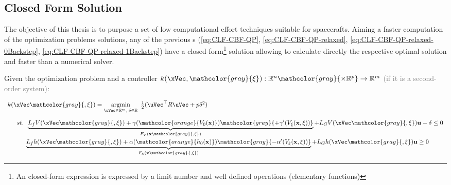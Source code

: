 \subsection{Closed Form Solution}
\label{sub:closed_form}

The objective of this thesis is to purpose a set of low computational effort techniques suitable for spacecrafts. Aiming a faster computation of the optimization problems solutions, any of the previous s (\ref{eq:CLF-CBF-QP}, \ref{eq:CLF-CBF-QP-relaxed}, \ref{eq:CLF-CBF-QP-relaxed-0Backstep}, \ref{eq:CLF-CBF-QP-relaxed-1Backstep}) have a closed-form\footnote{An closed-form expression is expressed by a limit number and well defined operations (elementary functions)} solution allowing to calculate directly the respective optimal solution and faster than a numerical solver.\par
Given the  optimization problem and a controller \(k(\xVec, \mathcolor{gray}{\mathbf{\xi}}): \mathbb{R}^n \mathcolor{gray}{\times \mathbb{R}^p} \to \mathbb{R}^m\) \textcolor{gray}{(if it is a second-order system)}:

\begin{equation}
    \begin{array}{l}
        k(\xVec \mathcolor{gray}{, \mathbf{\xi}}) = \underset{\uVec \in \mathbb{R}^m, \hspace{0.2em} \delta \in \mathbb{R}}{\mathrm{argmin}} \quad \hspace{-0.5em} \frac{1}{2} (\uVec^\top R \uVec + p\delta^2 ) \vspace{1em} \\ 
        \quad \hspace{0.5em}  st. \hspace{0.5em} \underbrace{L_fV(\xVec \mathcolor{gray}{, \mathbf{\xi}}) + \gamma(\mathcolor{orange}{V_0(\mathbf{x})}) \mathcolor{gray}{+ \gamma'(V_{\mathbf{\xi}}(\mathbf{x}, \mathbf{\xi}))}}_{F_V(\mathbf{x} \mathcolor{gray}{, \mathbf{\xi}})} + L_GV(\xVec \mathcolor{gray}{, \mathbf{\xi}})\mathbf{u} - \delta \leq  0 \vspace{0.25em}\\
        \quad \quad \hspace{1em}                 \underbrace{L_fh(\xVec \mathcolor{gray}{, \mathbf{\xi}}) + \alpha(\mathcolor{orange}{h_0(\mathbf{x})}) \mathcolor{gray}{- \alpha'(V_{\mathbf{\xi}}(\mathbf{x}, \mathbf{\xi}))}}_{F_h(\mathbf{x} \mathcolor{gray}{, \mathbf{\xi}})} + L_Gh(\xVec \mathcolor{gray}{, \mathbf{\xi}})\mathbf{u} \geq 0 
    \end{array}
 \label{eq:CLF-CBF-QP-relaxed-generic}
\end{equation}

